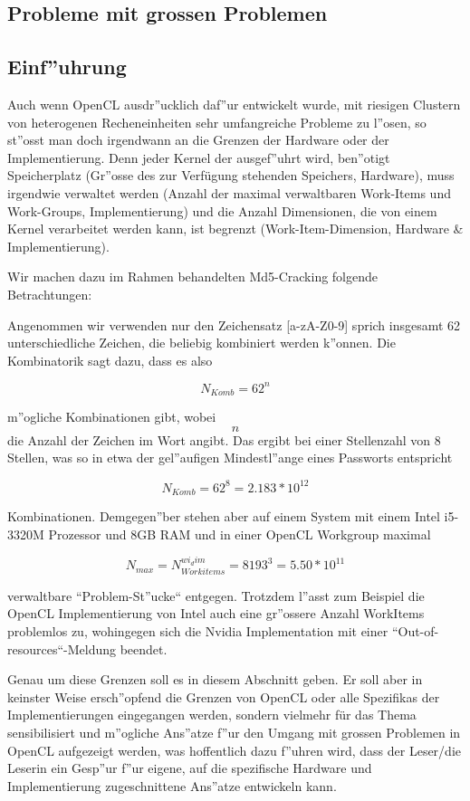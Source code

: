 \begin{refsection}
\section{Probleme mit grossen Problemen}

\subsection{Einf''uhrung}

Auch wenn OpenCL ausdr''ucklich daf''ur entwickelt wurde, mit riesigen Clustern
von heterogenen Recheneinheiten sehr umfangreiche Probleme zu l''osen, so 
st''osst man doch irgendwann an die Grenzen der Hardware oder der Implementierung.
Denn jeder Kernel der ausgef''uhrt wird, ben''otigt Speicherplatz (Gr''osse des
zur Verfügung stehenden Speichers, Hardware), muss irgendwie verwaltet werden 
(Anzahl der maximal verwaltbaren Work-Items und Work-Groups, Implementierung) und 
die Anzahl Dimensionen, die von einem Kernel verarbeitet werden kann, ist begrenzt
(Work-Item-Dimension, Hardware & Implementierung).

Wir machen dazu im Rahmen behandelten Md5-Cracking folgende Betrachtungen:

Angenommen wir verwenden nur den Zeichensatz [a-zA-Z0-9] sprich insgesamt 62 
unterschiedliche Zeichen, die beliebig kombiniert werden k''onnen. Die 
Kombinatorik sagt dazu, dass es also

\[
 N_{Komb} =  62^{n}
\]

m''ogliche Kombinationen gibt,  wobei \[n\] die Anzahl der Zeichen im Wort angibt. 
Das ergibt bei einer Stellenzahl von 8 Stellen, was so in etwa der gel''aufigen 
Mindestl''ange eines Passworts entspricht 

\[ 
 N_{Komb} = 62^{8} = 2.183 * 10^12 
\] 

Kombinationen. Demgegen''ber stehen aber auf einem System mit einem Intel i5-3320M 
Prozessor und 8GB RAM und in einer OpenCL Workgroup maximal

\[
 N_{max} = N_{Workitems}^{wi_dim} = 8193^{3} = 5.50 * 10^11
\]

verwaltbare ``Problem-St''ucke`` entgegen. Trotzdem l''asst zum Beispiel die OpenCL
Implementierung von Intel auch eine gr''ossere Anzahl WorkItems problemlos zu, 
wohingegen sich die Nvidia Implementation mit einer ``Out-of-resources``-Meldung 
beendet.

Genau um diese Grenzen soll es in diesem Abschnitt geben. Er soll aber in keinster
Weise ersch''opfend die Grenzen von OpenCL oder alle Spezifikas der 
Implementierungen eingegangen werden, sondern vielmehr für das Thema sensibilisiert 
und m''ogliche Ans''atze f''ur den Umgang mit grossen Problemen in OpenCL aufgezeigt
werden, was hoffentlich dazu f''uhren wird, dass der Leser/die Leserin ein Gesp''ur 
f''ur eigene, auf die spezifische Hardware und Implementierung zugeschnittene 
Ans''atze entwickeln kann.



\end{refsection}
